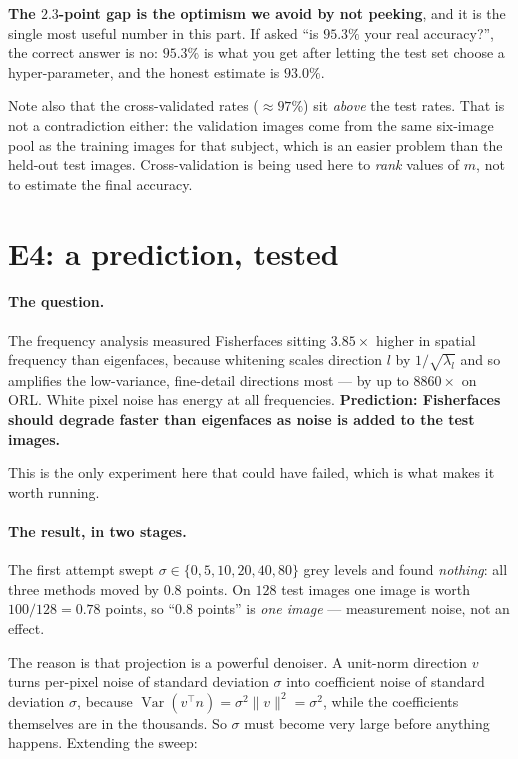 \begin{observation}
\textbf{The $2.3$-point gap is the optimism we avoid by not peeking}, and it is
the single most useful number in this part. If asked ``is $95.3\%$ your real
accuracy?'', the correct answer is no: $95.3\%$ is what you get after letting
the test set choose a hyper-parameter, and the honest estimate is $93.0\%$.

Note also that the cross-validated rates ($\approx 97\%$) sit \emph{above} the
test rates. That is not a contradiction either: the validation images come from
the same six-image pool as the training images for that subject, which is an
easier problem than the held-out test images. Cross-validation is being used
here to \emph{rank} values of $m$, not to estimate the final accuracy.
\end{observation}

\section{E4: a prediction, tested}

\paragraph{The question.} The frequency analysis measured Fisherfaces sitting
$3.85\times$ higher in spatial frequency than eigenfaces, because whitening
scales direction $l$ by $1/\sqrt{\lambda_l}$ and so amplifies the low-variance,
fine-detail directions most --- by up to $8860\times$ on ORL. White pixel noise
has energy at all frequencies. \textbf{Prediction: Fisherfaces should degrade
faster than eigenfaces as noise is added to the test images.}

This is the only experiment here that could have failed, which is what makes it
worth running.

\paragraph{The result, in two stages.} The first attempt swept
$\sigma \in \{0,5,10,20,40,80\}$ grey levels and found \emph{nothing}: all three
methods moved by $0.8$ points. On $128$ test images one image is worth
$100/128 = 0.78$ points, so ``$0.8$ points'' is \emph{one image} --- measurement
noise, not an effect.

The reason is that projection is a powerful denoiser. A unit-norm direction $v$
turns per-pixel noise of standard deviation $\sigma$ into coefficient noise of
standard deviation $\sigma$, because $\operatorname{Var}(v^{\!\top}n) = \sigma^2\|v\|^2 = \sigma^2$,
while the coefficients themselves are in the thousands. So $\sigma$ must become
very large before anything happens. Extending the sweep:

